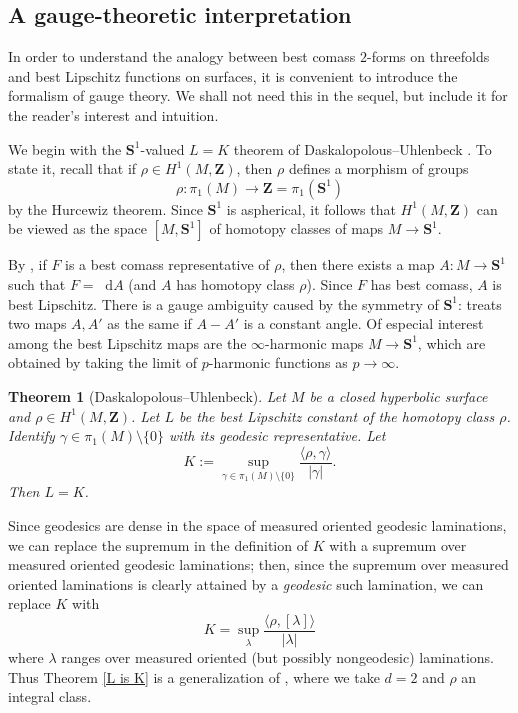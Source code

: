 \documentclass[reqno,11pt]{amsart}
\newcommand{\ZZ}{\mathbf{Z}}
\newcommand{\Sph}{\mathbf S}
\newcommand*\dif{\mathop{}\!\mathrm{d}}
\newtheorem{theorem}{Theorem}[section]
\theoremstyle{definition}
\numberwithin{equation}{section}
\begin{document}
\subsection{A gauge-theoretic interpretation}
In order to understand the analogy between best comass $2$-forms on threefolds and best Lipschitz functions on surfaces, it is convenient to introduce the formalism of gauge theory.
We shall not need this in the sequel, but include it for the reader's interest and intuition.

We begin with the $\Sph^1$-valued $L = K$ theorem of Daskalopolous--Uhlenbeck \cite[Theorem 5.8]{daskalopoulos2020transverse}.
To state it, recall that if $\rho \in H^1(M, \ZZ)$, then $\rho$ defines a morphism of groups
$$\rho: \pi_1(M) \to \ZZ = \pi_1(\Sph^1)$$
by the Hurcewiz theorem.
Since $\Sph^1$ is aspherical, it follows that $H^1(M, \ZZ)$ can be viewed as the space $[M, \Sph^1]$ of homotopy classes of maps $M \to \Sph^1$.

By \cite[\S2.1]{daskalopoulos2020transverse}, if $F$ is a best comass representative of $\rho$, then there exists a map $A: M \to \Sph^1$ such that $F = \dif A$ (and $A$ has homotopy class $\rho$).
Since $F$ has best comass, $A$ is best Lipschitz.
There is a gauge ambiguity caused by the symmetry of $\Sph^1$: \cite{daskalopoulos2020transverse} treats two maps $A, A'$ as the same if $A - A'$ is a constant angle.
Of especial interest among the best Lipschitz maps are the $\infty$-harmonic maps $M \to \Sph^1$, which are obtained by taking the limit of $p$-harmonic functions as $p \to \infty$.

\begin{theorem}[Daskalopolous--Uhlenbeck]
Let $M$ be a closed hyperbolic surface and $\rho \in H^1(M, \ZZ)$.
Let $L$ be the best Lipschitz constant of the homotopy class $\rho$.
Identify $\gamma \in \pi_1(M) \setminus \{0\}$ with its geodesic representative.
Let
$$K := \sup_{\gamma \in \pi_1(M) \setminus \{0\}} \frac{\langle \rho, \gamma\rangle}{|\gamma|}.$$
Then $L = K$.
\end{theorem}

Since geodesics are dense in the space of measured oriented geodesic laminations, we can replace the supremum in the definition of $K$ with a supremum over measured oriented geodesic laminations; then, since the supremum over measured oriented laminations is clearly attained by a \emph{geodesic} such lamination, we can replace $K$ with 
$$K = \sup_\lambda \frac{\langle \rho, [\lambda]\rangle}{|\lambda|}$$
where $\lambda$ ranges over measured oriented (but possibly nongeodesic) laminations.
Thus Theorem \ref{L is K} is a generalization of \cite[Theorem 5.8]{daskalopoulos2020transverse}, where we take $d = 2$ and $\rho$ an integral class.
\end{document}
